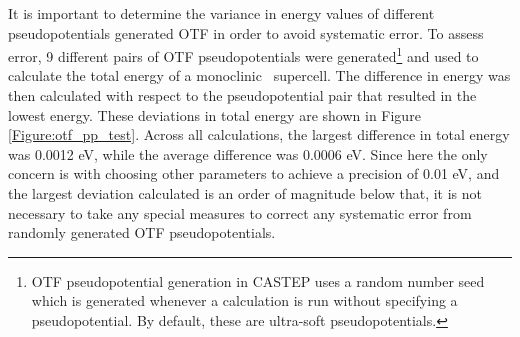 It is important to determine the variance in energy values of different pseudopotentials generated OTF in order to avoid systematic error. To assess error, 9 different pairs of OTF pseudopotentials were generated\footnote{OTF pseudopotential generation in CASTEP uses a random number seed which is generated whenever a calculation is run without specifying a pseudopotential. By default, these are ultra-soft pseudopotentials.} and used to calculate the total energy of a monoclinic \zirconia\ supercell. The difference in energy was then calculated with respect to the pseudopotential pair that resulted in the lowest energy. These deviations in total energy are shown in Figure \ref{Figure:otf_pp_test}. Across all calculations, the largest difference in total energy was 0.0012 eV, while the average difference was 0.0006 eV. Since here the only concern is with choosing other parameters to achieve a precision of 0.01 eV, and the largest deviation calculated is an order of magnitude below that, it is not necessary to take any special measures to correct any systematic error from randomly generated OTF pseudopotentials.


